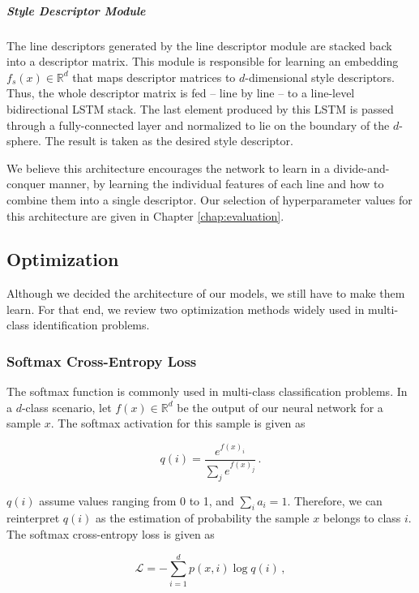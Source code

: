\subparagraph*{Style Descriptor Module}

The line descriptors generated by the line descriptor module are stacked back into a descriptor matrix. This module is responsible for learning an embedding $f_s(x) \in \mathbb{R}^d$ that maps descriptor matrices to $d$-dimensional style descriptors. Thus, the whole descriptor matrix is fed -- line by line -- to a line-level bidirectional LSTM stack. The last element produced by this LSTM is passed through a fully-connected layer and normalized to lie on the boundary of the $d$-sphere. The result is taken as the desired style descriptor.

We believe this architecture encourages the network to learn in a divide-and-conquer manner, by learning the individual features of each line and how to combine them into a single descriptor. Our selection of hyperparameter values for this architecture are given in Chapter \ref{chap:evaluation}.

\subsection{Optimization}\label{sec:optimization}
Although we decided the architecture of our models, we still have to make them learn. For that end, we review two optimization methods widely used in multi-class identification problems.

\subsubsection{Softmax Cross-Entropy Loss}\label{sec:softmax}

The softmax function is commonly used in multi-class classification problems. In a $d$-class scenario, let $f(x) \in \mathbb{R}^d$ be the output of our neural network for a sample $x$. The softmax activation for this sample is given as

\begin{equation}
q(i) = \frac{e^{f(x)_i}}{\sum_j e^{f(x)_j}} \,.
\end{equation}

$q(i)$ assume values ranging from 0 to 1, and $\sum_i a_i = 1$. Therefore, we can reinterpret $q(i)$ as the estimation of probability the sample $x$ belongs to class $i$. The softmax cross-entropy loss is given as

\begin{equation}
\mathcal{L} = -\sum_{i=1}^d p(x, i) \log q(i) \,,
\end{equation}

